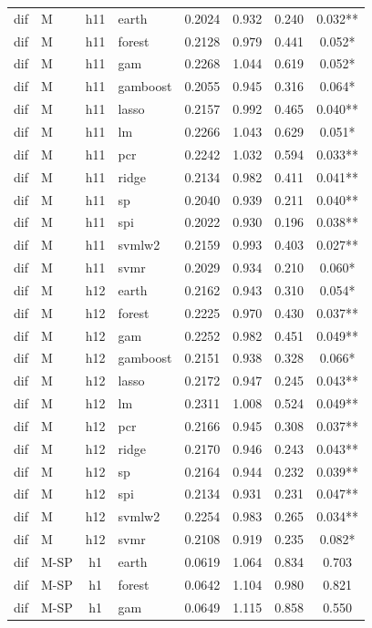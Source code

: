 \begin{ThreePartTable}
\begin{longtable}[t]{llclcccc}
\addlinespace
dif & M & h11 & earth & 0.2024 & 0.932 & 0.240 & 0.032**\\
dif & M & h11 & forest & 0.2128 & 0.979 & 0.441 & 0.052*\\
dif & M & h11 & gam & 0.2268 & 1.044 & 0.619 & 0.052*\\
dif & M & h11 & gamboost & 0.2055 & 0.945 & 0.316 & 0.064*\\
dif & M & h11 & lasso & 0.2157 & 0.992 & 0.465 & 0.040**\\
dif & M & h11 & lm & 0.2266 & 1.043 & 0.629 & 0.051*\\
dif & M & h11 & pcr & 0.2242 & 1.032 & 0.594 & 0.033**\\
dif & M & h11 & ridge & 0.2134 & 0.982 & 0.411 & 0.041**\\
dif & M & h11 & sp & 0.2040 & 0.939 & 0.211 & 0.040**\\
dif & M & h11 & spi & 0.2022 & 0.930 & 0.196 & 0.038**\\
dif & M & h11 & svmlw2 & 0.2159 & 0.993 & 0.403 & 0.027**\\
dif & M & h11 & svmr & 0.2029 & 0.934 & 0.210 & 0.060*\\
\addlinespace
dif & M & h12 & earth & 0.2162 & 0.943 & 0.310 & 0.054*\\
dif & M & h12 & forest & 0.2225 & 0.970 & 0.430 & 0.037**\\
dif & M & h12 & gam & 0.2252 & 0.982 & 0.451 & 0.049**\\
dif & M & h12 & gamboost & 0.2151 & 0.938 & 0.328 & 0.066*\\
dif & M & h12 & lasso & 0.2172 & 0.947 & 0.245 & 0.043**\\
dif & M & h12 & lm & 0.2311 & 1.008 & 0.524 & 0.049**\\
dif & M & h12 & pcr & 0.2166 & 0.945 & 0.308 & 0.037**\\
dif & M & h12 & ridge & 0.2170 & 0.946 & 0.243 & 0.043**\\
dif & M & h12 & sp & 0.2164 & 0.944 & 0.232 & 0.039**\\
dif & M & h12 & spi & 0.2134 & 0.931 & 0.231 & 0.047**\\
dif & M & h12 & svmlw2 & 0.2254 & 0.983 & 0.265 & 0.034**\\
dif & M & h12 & svmr & 0.2108 & 0.919 & 0.235 & 0.082*\\
\addlinespace
dif & M-SP & h1 & earth & 0.0619 & 1.064 & 0.834 & 0.703\\
dif & M-SP & h1 & forest & 0.0642 & 1.104 & 0.980 & 0.821\\
dif & M-SP & h1 & gam & 0.0649 & 1.115 & 0.858 & 0.550\\

\end{longtable}
\end{ThreePartTable}
